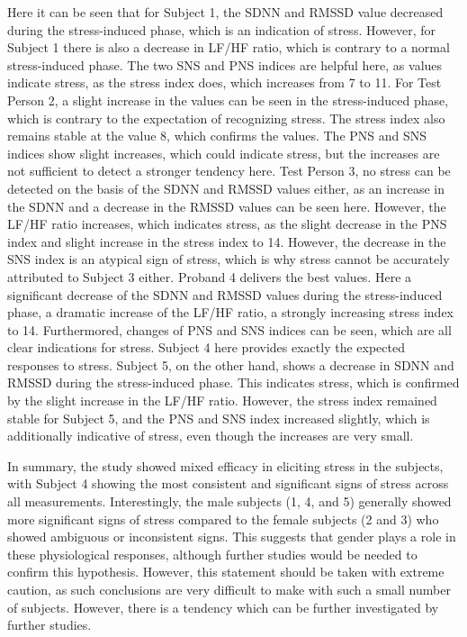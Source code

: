 Here it can be seen that for Subject 1, the SDNN and RMSSD value decreased during the stress-induced phase, which is an indication of stress.
However, for Subject 1 there is also a decrease in LF/HF ratio, which is contrary to a normal stress-induced phase.
The two SNS and PNS indices are helpful here, as values indicate stress, as the stress index does, which increases from 7 to 11.
For Test Person 2, a slight increase in the values can be seen in the stress-induced phase, which is contrary to the expectation of recognizing stress.
The stress index also remains stable at the value 8, which confirms the values. 
The PNS and SNS indices show slight increases, which could indicate stress, but the increases are not sufficient to detect a stronger tendency here. 
Test Person 3, no stress can be detected on the basis of the SDNN and RMSSD values either, as an increase in the SDNN and a decrease in the RMSSD values can be seen here. 
However, the LF/HF ratio increases, which indicates stress, as the slight decrease in the PNS index and slight increase in the stress index to 14. 
However, the decrease in the SNS index is an atypical sign of stress, which is why stress cannot be accurately attributed to Subject 3 either.
Proband 4 delivers the best values.
Here a significant decrease of the SDNN and RMSSD values during the stress-induced phase, a dramatic increase of the LF/HF ratio, a strongly increasing stress index to 14.
Furthermored, changes of PNS and SNS indices can be seen, which are all clear indications for stress.
Subject 4 here provides exactly the expected responses to stress.
Subject 5, on the other hand, shows a decrease in SDNN and RMSSD during the stress-induced phase. 
This indicates stress, which is confirmed by the slight increase in the LF/HF ratio.
However, the stress index remained stable for Subject 5, and the PNS and SNS index increased slightly, which is additionally indicative of stress, even though the increases are very small.

In summary, the study showed mixed efficacy in eliciting stress in the subjects, with Subject 4 showing the most consistent and significant signs of stress across all measurements. Interestingly, the male subjects (1, 4, and 5) generally showed more significant signs of stress compared to the female subjects (2 and 3) who showed ambiguous or inconsistent signs. This suggests that gender plays a role in these physiological responses, although further studies would be needed to confirm this hypothesis.
However, this statement should be taken with extreme caution, as such conclusions are very difficult to make with such a small number of subjects.
However, there is a tendency which can be further investigated by further studies.

